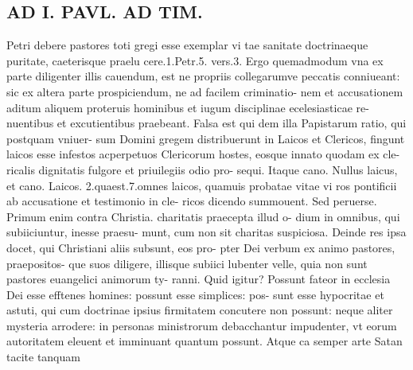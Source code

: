 \documentclass{article}
\begin{document}
\begin{pages}
\section*{AD I. PAVL. AD TIM. }
\marginpar{[ p.312 ]}\pstart Petri debere pastores toti gregi esse exemplar vi tae sanitate doctrinaeque puritate, caeterisque praelu cere.1.Petr.5. vers.3. Ergo quemadmodum vna ex parte diligenter illis cauendum, est ne propriis collegarumve peccatis conniueant: sic ex altera parte prospiciendum, ne ad facilem criminatio- nem et accusationem aditum aliquem proteruis hominibus et iugum disciplinae ecelesiasticae re- nuentibus et excutientibus praebeant. Falsa est qui dem illa Papistarum ratio, qui postquam vniuer- sum Domini gregem distribuerunt in Laicos et Clericos, fingunt laicos esse infestos acperpetuos Clericorum hostes, eosque innato quodam ex cle- ricalis dignitatis fulgore et priuilegiis odio pro- sequi. Itaque cano. Nullus laicus, et cano. Laicos. 2.quaest.7.omnes laicos, quamuis probatae vitae vi ros pontificii ab accusatione et testimonio in cle- ricos dicendo summouent. Sed peruerse. Primum enim contra Christia. charitatis praecepta illud o- dium in omnibus, qui subiiciuntur, inesse praesu- munt, cum non sit charitas suspiciosa. Deinde res ipsa docet, qui Christiani aliis subsunt, eos pro- pter Dei verbum ex animo pastores, praepositos- que suos diligere, illisque subiici lubenter velle, quia non sunt pastores euangelici animorum ty- ranni. Quid igitur? Possunt fateor in ecclesia Dei esse efftenes homines: possunt esse simplices: pos- sunt esse hypocritae et astuti, qui cum doctrinae ipsius firmitatem concutere non possunt: neque aliter mysteria arrodere: in personas ministrorum debacchantur impudenter, vt eorum autoritatem eleuent et imminuant quantum possunt. Atque ca semper arte Satan tacite tanquam  \pend

\end{pages}
\end{document}
